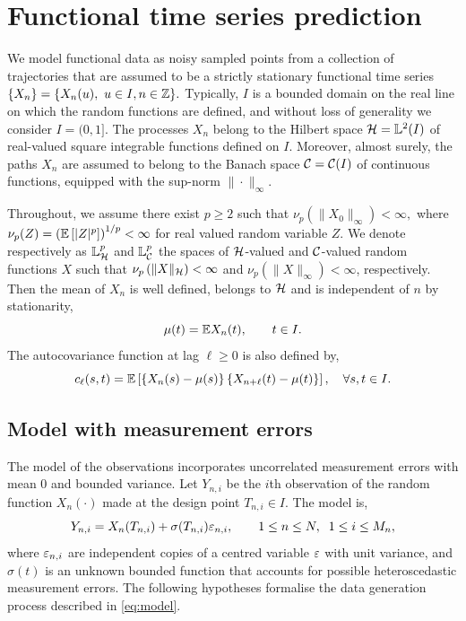 \documentclass{article}
\begin{document}
\section{Functional time series prediction}\label{sec:blup:FTS_prediction}


We model functional data as noisy sampled points from a collection of trajectories that are assumed to be a strictly stationary functional time series $\{X_n\} =\{X_n(u),\ u\in I,n\in\mathbb{Z}\}.$
Typically, $I$ is a bounded domain on the real line on which the random functions are defined, and without loss of generality we consider $I=(0,1]$.
The processes $X_n$ belong to the Hilbert space $\mathcal{H}=\mathbb{L}^2(I)$ of real-valued square integrable functions defined on $I$.
Moreover, almost surely, the paths $X_n$ are assumed to belong to the Banach space $\mathcal{C}=\mathcal{C}(I)$ of continuous functions, equipped with the sup-norm $\|\cdot\|_\infty$.

Throughout, we assume there exist $p\geq 2$ such that $\nu_p(\|X_0\|_\infty)<\infty,$ where $\nu_p(Z) = \left(\mathbb{E}\left[ |Z|^p \right]\right)^{1/p} < \infty$ for real valued random variable $Z$.
We denote respectively as $\mathbb{L}^p_{\mathcal{H}}$ and $\mathbb{L}^p_{\mathcal{C}}$ the spaces of $\mathcal{H}$-valued and  $\mathcal{C}$-valued random functions $X$ such that $\nu_p\left(\|X\|_{\mathcal{H}} \right) < \infty$ and  $\nu_p\left(\|X\|_\infty \right) < \infty$, respectively.
Then the mean of $X_n$ is well defined, belongs to $\mathcal{H}$ and is independent of $n$ by stationarity,
$$
\mu(t)=\mathbb{E} X_n(t),\qquad t\in I.
$$
The autocovariance function at lag $\ell\geq 0$ is also defined by,
$$
c_\ell (s,t) =  \mathbb{E}\left[ \left\{X_n(s) - \mu(s)\right\}  \left\{X_{n+\ell}(t)-\mu(t)\right\} \right],\quad  \forall s,t\in I.
$$

\subsection{Model with measurement errors}

The model of the observations incorporates uncorrelated measurement errors with mean $0$ and bounded variance.
Let $Y_{n,i}$ be the $i$th observation of the random function $X_n(\cdot)$ made at the design point $T_{n,i}\in I$. The model is,
\begin{equation}\label{eq:model}
	Y_{n,i} = X_n(T_{n,i}) + \sigma(T_{n,i}){\varepsilon}_{n,i},   
	\qquad 1\leq n \leq N,  \; \; 1\leq i \leq M_n,
\end{equation}
where ${\varepsilon}_{n,i}$ are independent copies of a centred variable ${\varepsilon}$ with unit variance, and $\sigma(t)$ is an unknown bounded function that accounts for possible heteroscedastic measurement errors. 
The following hypotheses formalise the data generation process described in \eqref{eq:model}.
\end{document}
